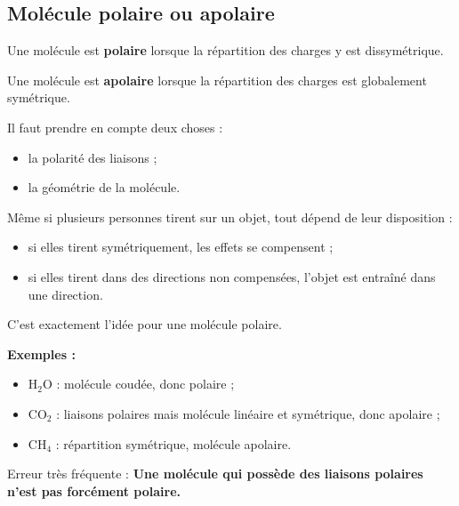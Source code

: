 \documentclass[11pt,a4paper]{article}
\begin{document}
\subsection{Molécule polaire ou apolaire}

\begin{definitionbox}
Une molécule est \textbf{polaire} lorsque la répartition des charges y est dissymétrique.
\end{definitionbox}

\begin{definitionbox}
Une molécule est \textbf{apolaire} lorsque la répartition des charges est globalement symétrique.
\end{definitionbox}

\begin{ideebox}
Il faut prendre en compte deux choses :
\begin{itemize}
    \item la polarité des liaisons ;
    \item la géométrie de la molécule.
\end{itemize}
\end{ideebox}

\begin{analogebox}
Même si plusieurs personnes tirent sur un objet, tout dépend de leur disposition :
\begin{itemize}
    \item si elles tirent symétriquement, les effets se compensent ;
    \item si elles tirent dans des directions non compensées, l’objet est entraîné dans une direction.
\end{itemize}
C’est exactement l’idée pour une molécule polaire.
\end{analogebox}

\begin{exemplebox}
\textbf{Exemples :}
\begin{itemize}
    \item \(\mathrm{H_2O}\) : molécule coudée, donc polaire ;
    \item \(\mathrm{CO_2}\) : liaisons polaires mais molécule linéaire et symétrique, donc apolaire ;
    \item \(\mathrm{CH_4}\) : répartition symétrique, molécule apolaire.
\end{itemize}
\end{exemplebox}

\begin{attentionbox}
Erreur très fréquente :  
\textbf{Une molécule qui possède des liaisons polaires n’est pas forcément polaire.}
\end{attentionbox}
\end{document}
